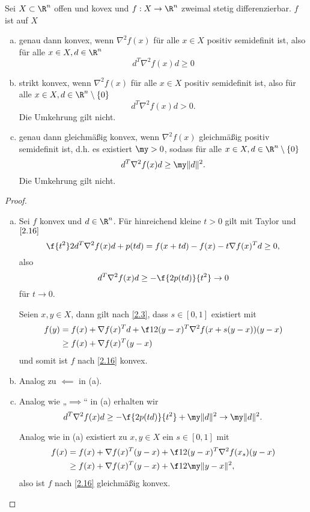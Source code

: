\begin{st} \label{2.17}
	Sei $X \subset \R^n$ offen und kovex und $f: X \to \R^n$ zweimal stetig differenzierbar.
	$f$ ist auf $X$
	\begin{enumerate}[(a)]
		\item
			genau dann konvex, wenn $\nabla^2 f(x)$ für alle $x \in X$ positiv semidefinit ist, also für alle $x \in X, d \in \R^n$
			\[
				d^T \nabla^2 f(x) d \ge 0
			\]
		\item
			strikt konvex, wenn $\nabla^2 f(x)$ für alle $x \in X$ positiv semidefinit ist, also für alle $x \in X, d \in \R^n \setminus \{0\}$
			\[
				d^T \nabla^2 f(x) d > 0.
			\]
			Die Umkehrung gilt nicht.
		\item
			genau dann gleichmäßig konvex, wenn $\nabla^2 f(x)$ gleichmäßig positiv semidefinit ist, d.h. es existiert $\my > 0$, sodass für alle $x \in X, d \in \R^n \setminus \{0\}$
			\[
				d^T \nabla^2 f(x) d \ge \my \|d\|^2.
			\]
			Die Umkehrung gilt nicht.
	\end{enumerate}
	\begin{proof}
		\begin{enumerate}[(a)]
			\item
				\begin{seg}[„$\implies$“]
					Sei $f$ konvex und $d \in \R^n$.
					Für hinreichend kleine $t > 0$ gilt mit Taylor und $\ref{2.16}$
					\[
						\f {t^2}2 d^T \nabla^2 f(x) d + p(td)
						= f(x+td) - f(x) - t \nabla f(x)^T d
						\ge 0,
					\]
					also
					\[
						d^T \nabla^2 f(x) d
						\ge - \f {2 p(td)}{t^2} \to 0
					\]
					für $t \to 0$.
				\end{seg}
				\begin{seg}[$\impliedby$]
					Seien $x,y \in X$, dann gilt nach \ref{2.3}, dass $s \in [0,1]$ existiert mit
					\begin{align*}
						f(y)
						&= f(x) + \nabla f(x)^T d  + \f 12 (y-x)^T \nabla^2 f(x+s(y-x))(y-x) \\
						&\ge f(x) + \nabla f(x)^T (y-x)
					\end{align*}
					und somit ist $f$ nach \ref{2.16} konvex.
				\end{seg}
			\item
				Analog zu $\impliedby$ in (a).
			\item
				\begin{seg}[„$\implies$“]
					Analog wie „$\implies$“ in (a) erhalten wir
					\[
						d^T \nabla^2 f(x) d
						\ge - \f {2 p(td)}{t^2} + \my \|d\|^2
						\to \my \|d\|^2.
					\]
				\end{seg}
				\begin{seg}[„$\impliedby$“]
					Analog wie in (a) existiert zu $x,y \in X$ ein $s \in [0,1]$ mit
					\begin{align*}
						f(x)
						&= f(x) + \nabla f(x)^T (y-x) + \f 12 (y-x)^T \nabla^2 f(x_s) (y-x) \\
						&\ge f(x) + \nabla f(x)^T (y-x) + \f 12 \my \|y-x\|^2,
					\end{align*}
					also ist $f$ nach \ref{2.16} gleichmäßig konvex.
				\end{seg}
		\end{enumerate}
	\end{proof}
\end{st}

